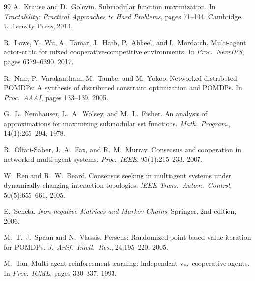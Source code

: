 \begin{thebibliography}{99}
A.\ Krause and D.\ Golovin.
\newblock Submodular function maximization.
\newblock In \textit{Tractability: Practical Approaches to Hard Problems},
  pages 71--104. Cambridge University Press, 2014.

R.\ Lowe, Y.\ Wu, A.\ Tamar, J.\ Harb, P.\ Abbeel, and I.\ Mordatch.
\newblock Multi-agent actor-critic for mixed cooperative-competitive environments.
\newblock In \textit{Proc.\ NeurIPS}, pages 6379--6390, 2017.

R.\ Nair, P.\ Varakantham, M.\ Tambe, and M.\ Yokoo.
\newblock Networked distributed POMDPs: A synthesis of distributed constraint
  optimization and POMDPs.
\newblock In \textit{Proc.\ AAAI}, pages 133--139, 2005.

G.\ L.\ Nemhauser, L.\ A.\ Wolsey, and M.\ L.\ Fisher.
\newblock An analysis of approximations for maximizing submodular set functions.
\newblock \textit{Math.\ Program.}, 14(1):265--294, 1978.

R.\ Olfati-Saber, J.\ A.\ Fax, and R.\ M.\ Murray.
\newblock Consensus and cooperation in networked multi-agent systems.
\newblock \textit{Proc.\ IEEE}, 95(1):215--233, 2007.

W.\ Ren and R.\ W.\ Beard.
\newblock Consensus seeking in multiagent systems under dynamically changing
  interaction topologies.
\newblock \textit{IEEE Trans.\ Autom.\ Control}, 50(5):655--661, 2005.

E.\ Seneta.
\newblock \textit{Non-negative Matrices and Markov Chains}.
\newblock Springer, 2nd edition, 2006.

M.\ T.\ J.\ Spaan and N.\ Vlassis.
\newblock Perseus: Randomized point-based value iteration for POMDPs.
\newblock \textit{J.\ Artif.\ Intell.\ Res.}, 24:195--220, 2005.

M.\ Tan.
\newblock Multi-agent reinforcement learning: Independent vs.\ cooperative agents.
\newblock In \textit{Proc.\ ICML}, pages 330--337, 1993.

\end{thebibliography}

